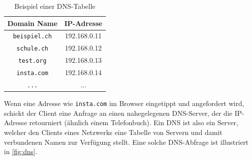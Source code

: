 \begin{table}[H]
	\centering
	\begin{tabular}{cc}
		\textbf{Domain Name} & \textbf{\gls{IP}-Adresse} \\
		\midrule
		\texttt{beispiel.ch} & 192.168.0.11         \\
		\midrule
		\texttt{schule.ch}   & 192.168.0.12         \\
		\midrule
		\texttt{test.org}    & 192.168.0.13         \\
		\midrule
		\texttt{insta.com}   & 192.168.0.14         \\
		\midrule
		\texttt{...}         & ...                  \\
	\end{tabular}
	\caption{Beispiel einer \gls{DNS}-Tabelle}
	\label{tab:dnsEntries}
\end{table}

Wenn eine Adresse wie \texttt{insta.com} im Browser eingetippt und angefordert wird, schickt der Client eine Anfrage an einen nahegelegenen \gls{DNS}-Server, der die \gls{IP}-Adresse retourniert (ähnlich einem Telefonbuch). Ein \gls{DNS} ist also ein Server, welcher den Clients eines Netzwerks eine Tabelle von Servern und damit verbundenen Namen zur Verfügung stellt. Eine solche \gls{DNS}-Abfrage ist illustriert in \cref{fig:dns}.

